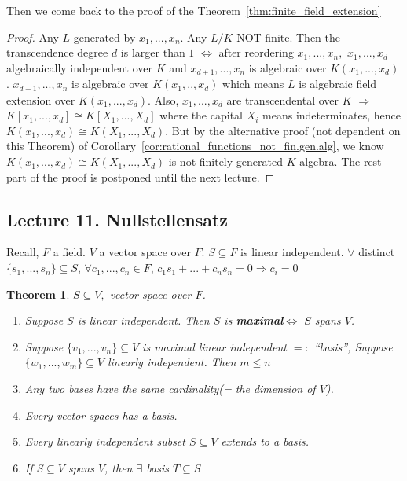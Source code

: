 \documentclass[11pt]{article}
\newtheorem{thm}{Theorem}[section]
\newcommand{\Lrta}{\Longrightarrow}
\newcommand{\Llrta}{\Longleftrightarrow}
\begin{document}
Then we come back to the proof of the Theorem~\ref{thm:finite_field_extension}
\begin{proof}
Any $ L$ generated by $x_1,...,x_n$. Any $ L/K$ NOT finite. Then the  transcendence degree $d$ is larger than $1$
$\Llrta$ after reordering $x_1,...,x_n,$ $x_1,...,x_d$ algebraically independent over $K$ and $x_{d+1},...,x_n$ is algebraic over $K(x_1,...,x_d)$. $x_{d+1},...,x_n$ is algebraic over $K(x_1,..,x_d)$ which means $ L$ is algebraic field extension over $K(x_1,...,x_d)$. Also, $x_1,...,x_d$ are transcendental over $K$ $\Lrta$ $K[x_1,...,x_d]\cong K[X_1,...,X_d]$ where the capital $X_i$ means indeterminates, hence $K(x_1,...,x_d)\cong K(X_1,...,X_d)$. But by the alternative proof (not dependent on this Theorem) of Corollary~\ref{cor:rational_functions_not_fin.gen.alg}, we know  $K(x_1,...,x_d)\cong K(X_1,...,X_d)$ is not finitely generated $K$-algebra. The rest part of the proof is postponed until the next lecture.
\end{proof}

\subsection{Lecture 11. Nullstellensatz}

Recall, $F$ a field. $V$ a vector space over $F$. $S\subseteq F$ is linear independent. $\forall $ distinct $\{s_1,...,s_n\}\subseteq S$, $\forall c_1,...,c_n\in F$, $c_1 s_1+...+c_n s_n=0\Lrta c_i=0$

\begin{thm}
$S\subseteq V,$ vector space over $F$. 
\begin{enumerate}[label=(\alph*)]
\item Suppose $S$ is linear independent. Then $S$ is \textbf{maximal}$\Llrta$ $S$ spans $V$.
\item Suppose $\{v_1,...,v_n\}\subseteq V$ is maximal linear independent $=:$ ``basis'', Suppose $\{w_1,...,w_m\}\subseteq V$ linearly independent. Then $m\leq n$
\item  Any two bases have the same cardinality(= the dimension of $V$).
\item Every vector spaces has a basis.
\item Every linearly independent subset $S\subseteq V$ extends to a basis.
\item If $S\subseteq V$ spans $V$, then $\exists $ basis $T\subseteq S$
\end{enumerate}
\end{thm}
\end{document}
